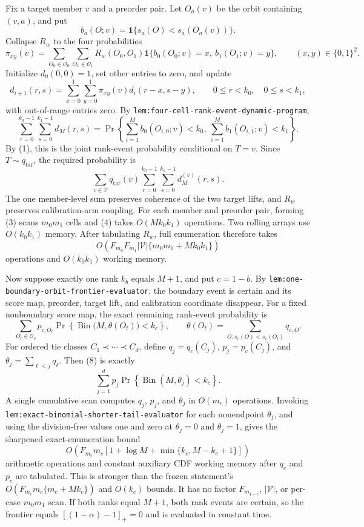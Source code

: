 Fix a target member \(v\) and a preorder pair. Let \(O_a(v)\) be the orbit containing \((v,a)\), and put
\[
b_a(O;v)=\mathbf 1\{s_a(O)<s_a(O_a(v))\}.
\]
Collapse \(R_w\) to the four probabilities
\[
\pi_{xy}(v)=\sum_{O_0\in\mathcal O_0}\sum_{O_1\in\mathcal O_1}R_w(O_0,O_1)
\mathbf 1\{b_0(O_0;v)=x,\ b_1(O_1;v)=y\},\qquad (x,y)\in\{0,1\}^2.
\tag{3}
\]
Initialize \(d_0(0,0)=1\), set other entries to zero, and update
\[
d_{i+1}(r,s)=\sum_{x=0}^1\sum_{y=0}^1\pi_{xy}(v)d_i(r-x,s-y),
\qquad 0\le r<k_0,\quad 0\le s<k_1,
\tag{4}
\]
with out-of-range entries zero. By \texttt{lem:four-cell-rank-event-dynamic-program},
\[
\sum_{r=0}^{k_0-1}\sum_{s=0}^{k_1-1}d_M(r,s)
=\Pr\!\left\{\sum_{i=1}^M b_0(O_{i,0};v)<k_0,\ \sum_{i=1}^M b_1(O_{i,1};v)<k_1\right\}.
\tag{5}
\]
By (1), this is the joint rank-event probability conditional on \(T=v\). Since \(T\sim q_{\mathrm{tar}}\), the required probability is
\[
\sum_{v\in\mathcal V}q_{\mathrm{tar}}(v)
\sum_{r=0}^{k_0-1}\sum_{s=0}^{k_1-1}d_M^{(v)}(r,s).
\tag{6}
\]
The one member-level sum preserves coherence of the two target lifts, and \(R_w\) preserves calibration-arm coupling. For each member and preorder pair, forming (3) scans \(m_0m_1\) cells and (4) takes \(O(Mk_0k_1)\) operations. Two rolling arrays use \(O(k_0k_1)\) memory. After tabulating \(R_w\), full enumeration therefore takes
\[
O\!\left(F_{m_0}F_{m_1}|\mathcal V|\{m_0m_1+Mk_0k_1\}\right)
\tag{7}
\]
operations and \(O(k_0k_1)\) working memory.

Now suppose exactly one rank \(k_b\) equals \(M+1\), and put \(c=1-b\). By \texttt{lem:one-boundary-orbit-frontier-evaluator}, the boundary event is certain and its score map, preorder, target lift, and calibration coordinate disappear. For a fixed nonboundary score map, the exact remaining rank-event probability is
\[
\sum_{O_t\in\mathcal O_c}p_{c,O_t}
\Pr\!\left\{\operatorname{Bin}\bigl(M,\theta(O_t)\bigr)<k_c\right\},\qquad
\theta(O_t)=\sum_{O:s_c(O)<s_c(O_t)}q_{c,O}.
\tag{8}
\]
For ordered tie classes \(C_1\prec\cdots\prec C_d\), define \(q_j=q_c(C_j)\), \(p_j=p_c(C_j)\), and \(\theta_j=\sum_{\ell<j}q_\ell\). Then (8) is exactly
\[
\sum_{j=1}^d p_j\Pr\!\left\{\operatorname{Bin}(M,\theta_j)<k_c\right\}.
\tag{9}
\]
A single cumulative scan computes \(q_j\), \(p_j\), and \(\theta_j\) in \(O(m_c)\) operations. Invoking \texttt{lem:exact-binomial-shorter-tail-evaluator} for each nonendpoint \(\theta_j\), and using the division-free values one and zero at \(\theta_j=0\) and \(\theta_j=1\), gives the sharpened exact-enumeration bound
\[
O\!\left(F_{m_c}m_c\left[1+\log M+\min\{k_c,M-k_c+1\}\right]\right)
\tag{10}
\]
arithmetic operations and constant auxiliary CDF working memory after \(q_c\) and \(p_c\) are tabulated. This is stronger than the frozen statement's \(O(F_{m_c}m_c\{m_c+Mk_c\})\) and \(O(k_c)\) bounds. It has no factor \(F_{m_{1-c}}\), \(|\mathcal V|\), or per-case \(m_0m_1\) scan. If both ranks equal \(M+1\), both rank events are certain, so the frontier equals \([(1-\alpha)-1]_+=0\) and is evaluated in constant time.

